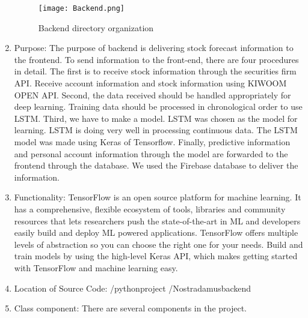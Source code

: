 \documentclass[conference]{IEEEtran}
\begin{document}
\begin{enumerate}

        \begin{figure}[h]
        \begin{center}
        \centering
        \texttt{[image: Backend.png]}
        \caption{Backend directory organization}
        \label{fig:my_label}
        \end{center}
        \end{figure}
        
        
    \item Purpose:
    The purpose of backend is delivering stock forecast information to the frontend. To send information to the front-end, there are four procedures in detail. The first is to receive stock information through the securities firm API. Receive account information and stock information using KIWOOM OPEN API. Second, the data received should be handled appropriately for deep learning. Training data should be processed in chronological order to use LSTM. Third, we have to make a model. LSTM was chosen as the model for learning. LSTM is doing very well in processing continuous data. The LSTM model was made using Keras of Tensorflow. Finally, predictive information and personal account information through the model are forwarded to the frontend through the database. We used the Firebase database to deliver the information.\vspace{1\baselineskip}
    
    \item Functionality:
    TensorFlow is an open source platform for machine learning. It has a comprehensive, flexible ecosystem of tools, libraries and community resources that lets researchers push the state-of-the-art in ML and developers easily build and deploy ML powered applications. TensorFlow offers multiple levels of abstraction so you can choose the right one for your needs. Build and train models by using the high-level Keras API, which makes getting started with TensorFlow and machine learning easy.\vspace{1\baselineskip}
    
    \item Location of Source Code:
    /pythonproject /Nostradamusbackend\vspace{1\baselineskip}
    
    \item Class component:
    There are several components in the project. \vspace{1\baselineskip}
    

\end{enumerate}
\end{document}
